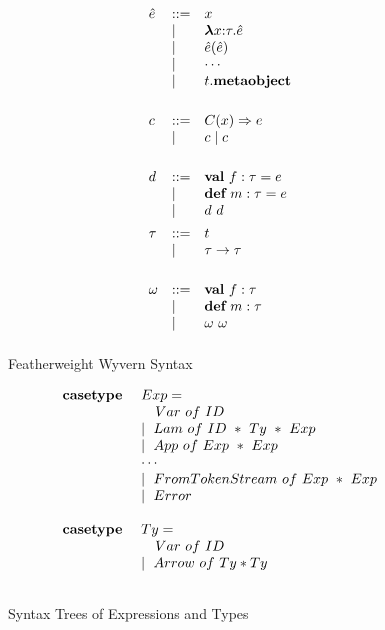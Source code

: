 \begin{figure}
\[\begin{array}{lll}
\\[1ex]
\hat{e}    & \bnfdef & x \\
     & \bnfalt & \boldsymbol\lambda x{:}\tau . \hat{e} \\ %
     & \bnfalt & \hat{e}(\hat{e}) \\
     & \bnfalt & \cdots \\
     & \bnfalt & t.\keyw{metaobject}\\
\\[1ex]
c    & \bnfdef & C(x) \Rightarrow e\\
     & \bnfalt & c \bnfalt c\\
	 \\[1ex]
d    & \bnfdef & \keyw{val}~ f:\tau = e \\
     & \bnfalt & \keyw{def}~ m:\tau = e \\
     & \bnfalt & d~d
\\[1ex]
\tau & \bnfdef & t\\
     & \bnfalt & \tau \rightarrow \tau \\
\\[1ex]
\omega   & \bnfdef & \keyw{val}~ f:\tau\\
         & \bnfalt & \keyw{def}~ m:\tau \\
         & \bnfalt & \omega~\omega 
\\[1ex]
\end{array}
\]
\caption{Featherweight Wyvern Syntax}
\label{fig:core2-syntax}
\end{figure}


\begin{figure}
\centering
\[
\begin{array}{ll}
\textbf{casetype}\ & Exp=\\
& \ \ \ Var\ of\ ID\\
& \mathrel{\mid} \ Lam\ of\ ID\ *\ Ty\ *\ Exp\\
& \mathrel{\mid} \ App\ of\ Exp\ *\ Exp\\
& \cdots\\
& \mathrel{\mid} \ FromTokenStream\ of\ Exp\ *\ Exp\\
& \mathrel{\mid} \ Error\\
\\
\textbf{casetype}\ & Ty=\\
& \ \ \ Var\ of\ ID\\
& \mathrel{\mid} \ Arrow\ of\ Ty*Ty\\
\\ 
\end{array}
\]
\caption{Syntax Trees of Expressions and Types}
\end{figure}






